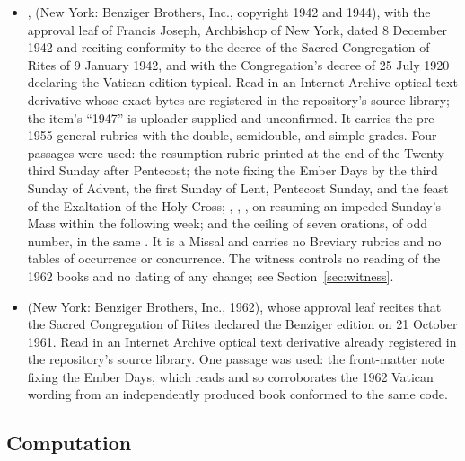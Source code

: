 \begin{itemize}[leftmargin=1.3em, itemsep=0.3em]
\item {},
 (New York: Benziger Brothers, Inc., copyright 1942 and
1944), with the approval leaf of Francis Joseph, Archbishop of New York, dated 8 December 1942
and reciting conformity to the decree of the Sacred Congregation of Rites of 9 January 1942, and
with the Congregation's decree of 25 July 1920 declaring the Vatican edition typical. Read in an
Internet Archive optical text derivative whose exact bytes are registered in the repository's
source library; the item's ``1947'' is uploader-supplied and unconfirmed. It carries the
pre-1955 general rubrics with the double, semidouble, and simple grades. Four passages were
used: the resumption rubric printed at the end of the Twenty-third Sunday after Pentecost; the
note fixing the Ember Days by the third Sunday of Advent, the first Sunday of Lent, Pentecost
Sunday, and the feast of the Exaltation of the Holy Cross; ,
, , on resuming an impeded Sunday's Mass
within the following week; and the ceiling of seven orations, of odd number, in the same
. It is a Missal and carries no Breviary rubrics and no tables
of occurrence or concurrence. The witness controls no reading of the 1962 books and no dating of
any change; see Section~\ref{sec:witness}.
\item {} (New York: Benziger Brothers, Inc.,
1962), whose approval leaf recites that the Sacred Congregation of Rites declared the Benziger
edition  on 21 October 1961. Read in an Internet Archive optical text
derivative already registered in the repository's source library. One passage was used: the
front-matter note fixing the Ember Days, which reads  and
so corroborates the 1962 Vatican wording from an independently produced book conformed to the
same code.
\end{itemize}

\subsection{Computation}

